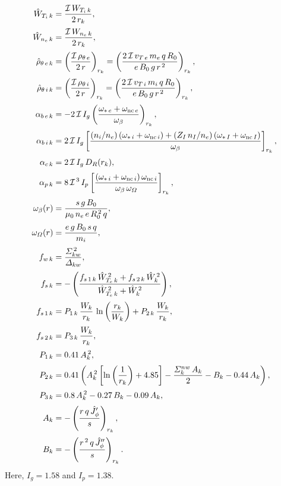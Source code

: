 \documentclass[notitlepage,12pt]{article}
\begin{document}
\begin{align}
\hat{W}_{T_i\,k} &= \frac{{\cal I}\,W_{T_i\,k}}{2\,r_k},\\[0.5ex]
\hat{W}_{n_e\,k} &= \frac{{\cal I}\,W_{n_e\,k}}{2\,r_k},\\[0.5ex]
\hat{\rho}_{\theta\,e\, k} &= \left(\frac{{\cal I}\,\rho_{\theta\,e}}{2\,r}\right)_{r_k}=\left(\frac{2\,{\cal I}\,v_{T\,e}\,m_e\,q\,R_0}{e\,B_0\,g\,r^{\,2}}\right)_{r_k},\\[0.5ex]
\hat{\rho}_{\theta\,i\,k} &= \left(\frac{{\cal I}\,\rho_{\theta\,i}}{2\,r}\right)_{r_k}= \left(\frac{2\,{\cal I}\,v_{T\,i}\,m_i\,q\,R_0}{e\,B_0\,g\,r^{\,2}}\right)_{r_k},\\[0.5ex]
\alpha_{b\,e\,k} &= -2\,{\cal I}\,I_g\left(\frac{\omega_{\ast\,e}+\omega_{{\rm nc}\,e}}{\omega_\beta}\right)_{r_k},\\[0.5ex]
\alpha_{b\,i\,k} &= 2\,{\cal I}\,I_g\left[\frac{(n_i/n_e)\left(\omega_{\ast\,i}+\omega_{{\rm nc}\,i}\right)+(Z_I\,n_I/n_e)\left(\omega_{\ast\,I}+\omega_{{\rm nc}\,I}\right)}{\omega_\beta}\right]_{r_k},\\[0.5ex]
\alpha_{c\,k} &= 2\,{\cal I}\,I_g\,D_R(r_k),\\[0.5ex]
\alpha_{p\,k} &= 8\,{\cal I}^{\,3}\, I_p\left[\frac{(\omega_{\ast\,i}+\omega_{{\rm nc}\,i})\,\omega_{{\rm nc}\,i}}{\omega_\beta\,\omega_{\mit\Omega}}\right]_{r_k},\\[0.5ex]
\omega_{\beta}(r)&= \frac{s\,g\,B_0}{\mu_0\,n_e\,e\,R_0^{\,2}\,q},\\[0.5ex]
\omega_{\mit\Omega}(r)&= \frac{e\,g\,B_0\,s\,q}{m_i},\\[0.5ex]
f_{w\,k} &= \frac{{\mit\Sigma}_{kw}^{\,2}}{{\mit\Delta}_{kw}},\\[0.5ex]
f_{s\,k} &=-\left(\frac{f_{s\,1\,k} \,\hat{W}_{T_e\,k}^{\,2}+ f_{s\,2\,k} \,\hat{W}_k^{\,2}}{\hat{W}_{T_e\,k}^{\,2}+ \hat{W}_k^{\,2}}\right),\\[0.5ex]
f_{s\,1\,k} &= P_{1\,k}\,\frac{W_k}{r_k}\,\ln\left(\frac{r_k}{W_k}\right)+ P_{2\,k}\,\frac{W_k}{r_k},\\[0.5ex]
f_{s\,2\,k} &= P_{3\,k}\,\frac{W_k}{r_k},\\[0.5ex]
P_{1\,k} &= 0.41\,A_k^{\,2},\\[0.5ex]
P_{2\,k} &= 0.41\left(A_k^{\,2}\left[\ln\left(\frac{1}{r_k}\right)+4.85\right] - \frac{{\mit\Sigma}^{nw}_k\,A_k}{2} - B_k - 0.44\,A_k\right),\\[0.5ex]
P_{3\,k} &= 0.8\,A_k^{\,2} - 0.27\,B_k-0.09\,A_k,\\[0.5ex]
A_k &= -\left(\frac{r\,q\,\hat{J}_\phi'}{s}\right)_{r_k},\\[0.5ex]
B_k &= -\left(\frac{r^{\,2}\,q\,\hat{J}_\phi''}{s}\right)_{r_k}.
\end{align}
Here, $I_g=1.58$ and $I_p=1.38$. 
\end{document}
